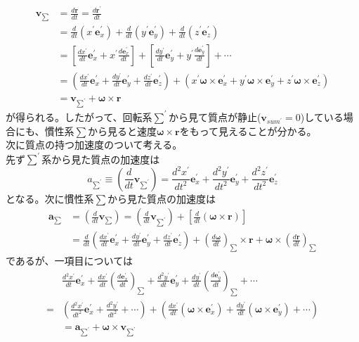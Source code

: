 \documentclass{jsarticle}
\begin{document}
\begin{align*}
\bm{v}_{\sum}&=\frac{d\bm{r}}{dt}=\frac{d\bm{r}^{\prime}}{dt}\\
&=\frac{d}{dt}(x^{\prime}\bm{e}_{x}^{\prime})+\frac{d}{dt}(y^{\prime}\bm{e}_{y}^{\prime})+\frac{d}{dt}(z^{\prime}\bm{e}_{z}^{\prime})\\
&=\left[\frac{dx^{\prime}}{dt}\bm{e}_{x}^{\prime}+x^{\prime}\frac{d\bm{e}_{x}^{\prime}}{dt}\right]+\left[\frac{dy^{\prime}}{dt}\bm{e}_{y}^{\prime}+y^{\prime}\frac{d\bm{e}_{y}^{\prime}}{dt}\right]+\cdots\\
&=\left(\frac{dx^{\prime}}{dt}\bm{e}_{x}^{\prime}+\frac{dy^{\prime}}{dt}\bm{e}_{y}^{\prime}+\frac{dz^{\prime}}{dt}\bm{e}_{z}^{\prime}\right)+(x^{\prime}\bm{\omega}\times\bm{e}_{x}^{\prime}+y^{\prime}\bm{\omega}\times\bm{e}_{y}^{\prime}+z^{\prime}\bm{\omega}\times\bm{e}_{z}^{\prime})\\
&=\bm{v}_{\sum^{\prime}}+\bm{\omega}\times\bm{r}
\end{align*}
が得られる。したがって、回転系\(\sum^{\prime}\)から見て質点が静止(\(\bm{v}_{sum^{\prime}}=0\))している場合にも、慣性系\(\sum\)から見ると速度\(\bm{\omega}\times\bm{r}\)をもって見えることが分かる。\\
次に質点の持つ加速度のついて考える。\\
先ず\(\sum^{\prime}\)系から見た質点の加速度は
\[a_{\sum^{\prime}}\equiv\left(\frac{d}{dt}\bm{v}_{\sum^{\prime}}\right)=\frac{d^2x^{\prime}}{dt^2}\bm{e}_{x}^{\prime}+\frac{d^2y^{\prime}}{dt^2}\bm{e}_{y}^{\prime}+\frac{d^2z^{\prime}}{dt^2}\bm{e}_{z}^{\prime}\]
となる。次に慣性系\(\sum\)から見た質点の加速度は
\begin{align*}
\bm{a}_{\sum}&=\left(\frac{d}{dt}\bm{v}_{\sum}\right)=\left(\frac{d}{dt}\bm{v}_{\sum^{\prime}}\right)+\left[\frac{d}{dt}(\bm{\omega}\times\bm{r})\right]\\
&=\frac{d}{dt}\left(\frac{dx^{\prime}}{dt}\bm{e}_{x}^{\prime}+\frac{dy^{\prime}}{dt}\bm{e}_{y}^{\prime}+\frac{dz^{\prime}}{dt}\bm{e}_{z}^{\prime}\right)+\left(\frac{d\bm{\omega}}{dt}\right)_{\sum}\times\bm{r}+\bm{\omega}\times\left(\frac{d\bm{r}}{dt}\right)_{\sum}
\end{align*}
であるが、一項目については
\begin{align*}
&\frac{d^2x^{\prime}}{dt}\bm{e}_{x}^{\prime}+\frac{dx^{\prime}}{dt}\left(\frac{d\bm{e}_{x}^{\prime}}{dt}\right)_{\sum}+\frac{d^2y^{\prime}}{dt}\bm{e}_{y}^{\prime}+\frac{dy^{\prime}}{dt}\left(\frac{d\bm{e}_{y}^{\prime}}{dt}\right)_{\sum}+\cdots\\
=&\left(\frac{d^2x^{\prime}}{dt^2}\bm{e}_{x}^{\prime}+\frac{d^2y^{\prime}}{dt^2}+\cdots\right)+\left(\frac{dx^{\prime}}{dt}(\bm{\omega}\times\bm{e}_{x}^{\prime})+\frac{dy^{\prime}}{dt}(\bm{\omega}\times\bm{e}_{y}^{\prime})+\cdots\right)\\
&=\bm{a}_{\sum^{\prime}}+\bm{\omega}\times\bm{v}_{\sum^{\prime}}
\end{align*}
\end{document}
